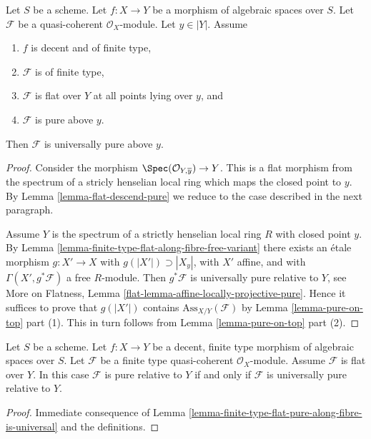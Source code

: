 \begin{lemma}
\label{lemma-finite-type-flat-pure-along-fibre-is-universal}
Let $S$ be a scheme. Let $f : X \to Y$ be a morphism of algebraic
spaces over $S$.
Let $\mathcal{F}$ be a quasi-coherent $\mathcal{O}_X$-module.
Let $y \in |Y|$.
Assume
\begin{enumerate}
\item $f$ is decent and of finite type,
\item $\mathcal{F}$ is of finite type,
\item $\mathcal{F}$ is flat over $Y$ at all points lying over $y$, and
\item $\mathcal{F}$ is pure above $y$.
\end{enumerate}
Then $\mathcal{F}$ is universally pure above $y$.
\end{lemma}

\begin{proof}
Consider the morphism $\Spec(\mathcal{O}_{Y, \overline{y}}) \to Y$.
This is a flat morphism from the spectrum of a stricly henselian
local ring which maps the closed point to $y$.
By Lemma \ref{lemma-flat-descend-pure} we reduce to the case
described in the next paragraph.

\medskip\noindent
Assume $Y$ is the spectrum of a strictly henselian local ring $R$
with closed point $y$.
By Lemma \ref{lemma-finite-type-flat-along-fibre-free-variant}
there exists an \'etale morphism $g : X' \to X$ with
$g(|X'|) \supset |X_y|$, with $X'$ affine, and with
$\Gamma(X', g^*\mathcal{F})$ a free $R$-module.
Then $g^*\mathcal{F}$ is universally pure relative to $Y$, see
More on Flatness, Lemma \ref{flat-lemma-affine-locally-projective-pure}.
Hence it suffices to prove that
$g(|X'|)$ contains $\text{Ass}_{X/Y}(\mathcal{F})$
by Lemma \ref{lemma-pure-on-top} part (1).
This in turn follows from
Lemma \ref{lemma-pure-on-top} part (2).
\end{proof}

\begin{lemma}
\label{lemma-finite-type-flat-pure-is-universal}
Let $S$ be a scheme.
Let $f : X \to Y$ be a decent, finite type morphism of algebraic
spaces over $S$.
Let $\mathcal{F}$ be a finite type quasi-coherent $\mathcal{O}_X$-module.
Assume $\mathcal{F}$ is flat over $Y$. In this case
$\mathcal{F}$ is pure relative to $Y$ if and only if $\mathcal{F}$
is universally pure relative to $Y$.
\end{lemma}

\begin{proof}
Immediate consequence of
Lemma \ref{lemma-finite-type-flat-pure-along-fibre-is-universal}
and the definitions.
\end{proof}

